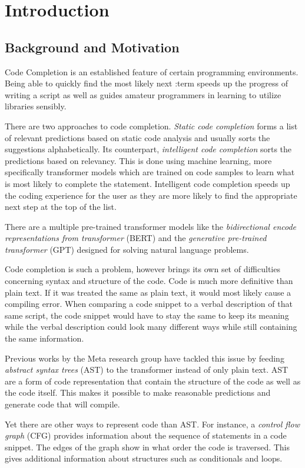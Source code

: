 \chapter{Introduction}

\section{Background and Motivation}
Code Completion is an established feature of certain programming environments. Being able to quickly find the most likely next :term speeds up the progress of writing a script as well as guides amateur programmers in learning to utilize libraries sensibly. 

There are two approaches to code completion. \textit{Static code completion} forms a list of relevant predictions based on static code analysis and usually sorts the suggestions alphabetically. Its counterpart, \textit{intelligent code completion} sorts the predictions based on relevancy. This is done using machine learning, more specifically transformer models which are trained on code samples to learn what is most likely to complete the statement. Intelligent code completion speeds up the coding experience for the user as they are more likely to find the appropriate next step at the top of the list.

There are a multiple pre-trained transformer models like the \textit{bidirectional encode representations from transformer} (BERT) and the \textit{generative pre-trained transformer} (GPT) designed for solving natural language problems.

Code completion is such a problem, however brings its own set of difficulties concerning syntax and structure of the code. Code is much more definitive than plain text. If it was treated the same as plain text, it would most likely cause a compiling error. When comparing a code snippet to a verbal description of that same script, the code snippet would have to stay the same to keep its meaning while the verbal description could look many different ways while still containing the same information.
 
Previous works by the Meta research group have tackled this issue by feeding \textit{abstract syntax trees} (AST) to the transformer instead of only plain text. AST are a form of code representation that contain the structure of the code as well as the code itself. This makes it possible to make reasonable predictions and generate code that will compile. 
 
Yet there are other ways to represent code than AST. For instance, a \textit{control flow graph} (CFG) provides information about the sequence of statements in a code snippet. The edges of the graph show in what order the code is traversed. This gives additional information about structures such as conditionals and loops. 

